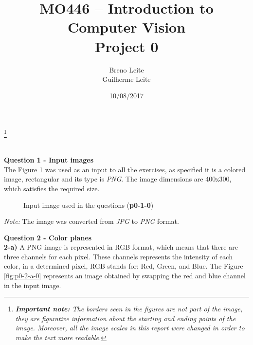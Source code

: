 \documentclass[12pt,a4paper]{article}
\title{MO446 -- Introduction to Computer Vision  \\ Project 0}
\author{Breno Leite  \\ Guilherme Leite}
\date{10/08/2017}
\newcommand\blfootnote[1]{%
	\begingroup
	\renewcommand\thefootnote{}\footnote{#1}%
	\addtocounter{footnote}{-1}%
	\endgroup
}
\begin{document}
\maketitle
\blfootnote{\textit{\textbf{Important note:} The borders seen in the figures are not part of the image, they are figurative information about the starting and ending points of the image. Moreover, all the image scales in this report were changed in order to make the text more readable.}} \\


\textbf{Question 1 - Input images} \\

The Figure \ref{fig:p0-1-0} was used as an input to all the exercises, as specified it is a colored image, rectangular and its type is \emph{PNG}. The image dimensions are 400x300, which satisfies the required size. \\

\begin{figure}[!h]
	\centering
	{%
		\setlength{\fboxsep}{1pt}%
		\setlength{\fboxrule}{1pt}%
	}%
	\caption{Input image used in the questions (\textbf{p0-1-0})}
	\label{fig:p0-1-0}
\end{figure}

\textit{Note:} The image was converted from \emph{JPG} to \emph{PNG} format. 

\newpage


\textbf{Question 2 - Color planes} \\

\textbf{2-a) } A PNG image is represented in RGB format, which means that there are three channels for each pixel. These channels represents the intensity of each color, in a determined pixel, RGB stands for: Red, Green, and Blue. The Figure \ref{fig:p0-2-a-0} represents an image obtained by swapping the red and blue channel in the input image.
\end{document}
